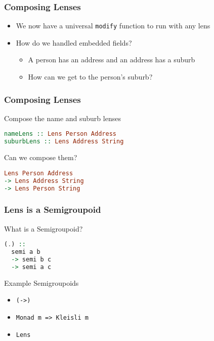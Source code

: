 \begin{frame}[fragile]
\frametitle{Composing Lenses}

\begin{itemize}
\item We now have a universal \lstinline[language=haskell]$modify$ function to run with any lens
\item How do we handled embedded fields?
  \begin{itemize}
  \item A person has an address and an address has a suburb
  \item How can we get to the person's suburb?
  \end{itemize}
\end{itemize}

\end{frame}

\begin{frame}[fragile]
\frametitle{Composing Lenses}

\begin{block}{Compose the name and suburb lenses}
\begin{lstlisting}[language=haskell]
nameLens :: Lens Person Address
suburbLens :: Lens Address String
\end{lstlisting}
\end{block}

\begin{block}{Can we compose them?}
\begin{lstlisting}[language=haskell]
Lens Person Address
-> Lens Address String
-> Lens Person String
\end{lstlisting}
\end{block}

\end{frame}

\begin{frame}[fragile]
\frametitle{Lens is a Semigroupoid}

\begin{block}{What is a Semigroupoid?}
\begin{lstlisting}[language=haskell]
(.) ::
  semi a b
  -> semi b c
  -> semi a c
\end{lstlisting}

\end{block}

\begin{block}{Example Semigroupoids}
\begin{itemize}
\item \lstinline$(->)$
\item \lstinline$Monad m => Kleisli m$
\item \lstinline$Lens$
\end{itemize}
\end{block}

\end{frame}

